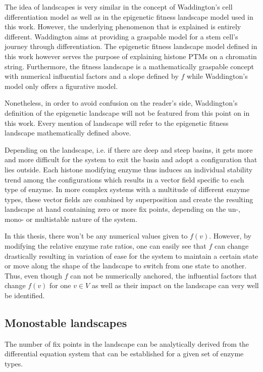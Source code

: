             The idea of landscapes is very similar in the concept of Waddington's cell differentiation model as well as in the epigenetic fitness landscape model used in this work. However, the underlying phenomenon that is explained is entirely different. Waddington aims at providing a graspable model for a stem cell's journey through differentiation. The epigenetic fitness landscape model defined in this work however serves the purpose of explaining histone PTMs on a chromatin string. Furthermore, the fitness landscape is a mathematically graspable concept with numerical influential factors and a slope defined by $f$ while Waddington's model only offers a figurative model.

            Nonetheless, in order to avoid confusion on the reader's side, Waddington's definition of the epigenetic landscape will not be featured from this point on in this work. Every mention of landscape will refer to the epigenetic fitness landscape mathematically defined above.

            Depending on the landscape, i.e. if there are deep and steep basins, it gets more and more difficult for the system to exit the basin and adopt a configuration that lies outside. Each histone modifying enzyme thus induces an individual stability trend among the configurations which results in a vector field specific to each type of enzyme. In more complex systems with a multitude of different enzyme types, these vector fields are combined by superposition and create the resulting landscape at hand containing zero or more fix points, depending on the un-, mono- or multistable nature of the system.

            In this thesis,  there won't be any numerical values given to $f(v)$. However, by modifying the relative enzyme rate ratios, one can easily see that $f$ can change drastically resulting in variation of ease for the system to maintain a certain state or move along the shape of the landscape to switch from one state to another. Thus, even though $f$ can not be numerically anchored, the influential factors that change $f(v)$ for one $v \in V$ as well as their impact on the landscape can very well be identified.
        \subsection{Monostable landscapes}
        \label{subsec:monostability}
            The number of fix points in the landscape can be analytically derived from the differential equation system that can be established for a given set of enzyme types.

